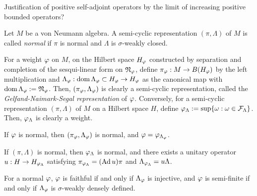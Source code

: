 \documentclass{../../large}
\begin{document}
Justification of positive self-adjoint operators by the limit of increasing positive bounded operators?



\begin{prb}
Let $M$ be a von Neumann algebra.
A semi-cyclic representation $(\pi,\Lambda)$ of $M$ is called \emph{normal} if $\pi$ is normal and $\Lambda$ is $\sigma$-weakly closed.

For a weight $\varphi$ on $M$, on the Hilbert space $H_\varphi$ constructed by separation and completion of the sesqui-linear form on $\mathfrak{N}_\varphi$, define $\pi_\varphi:M\to B(H_\varphi)$ by the left multiplication and $\Lambda_\varphi:\operatorname{dom}\Lambda_\varphi\subset H_\varphi\to H_\varphi$ as the canonical map with $\operatorname{dom}\Lambda_\varphi:=\mathfrak{N}_\varphi$.
Then, $(\pi_\varphi,\Lambda_\varphi)$ is clearly a semi-cyclic representation, called the \emph{Gelfand-Naimark-Segal representation} of $\varphi$.
Conversely, for a semi-cyclic representation $(\pi,\Lambda)$ of $M$ on a Hilbert space $H$, define $\varphi_\Lambda:=\sup\{\omega:\omega\in\mathcal{F}_\Lambda\}$.
Then, $\varphi_\Lambda$ is clearly a weight.
\begin{parts}
\item If $\varphi$ is normal, then $(\pi_\varphi,\Lambda_\varphi)$ is normal, and $\varphi=\varphi_{\Lambda_\varphi}$.
\item If $(\pi,\Lambda)$ is normal, then $\varphi_\Lambda$ is normal, and there exists a unitary operator $u:H\to H_{\varphi_\Lambda}$ satisfying $\pi_{\varphi_\Lambda}=(\operatorname{Ad} u)\pi$ and $\Lambda_{\varphi_\Lambda}=u\Lambda$.
\item For a normal $\varphi$, $\varphi$ is faithful if and only if $\Lambda_\varphi$ is injective, and $\varphi$ is semi-finite if and only if $\Lambda_\varphi$ is $\sigma$-weakly densely defined.
\end{parts}
\end{prb}
\end{document}
